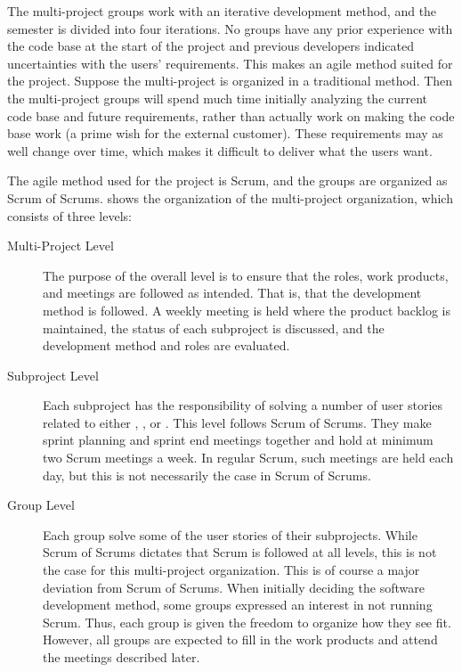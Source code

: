 The multi-project groups work with an iterative development method, and the semester is divided into four iterations. No groups have any prior experience with the code base at the start of the project and previous developers indicated uncertainties with the users' requirements. This makes an agile method suited for the project. Suppose the multi-project is organized in a traditional method. Then the multi-project groups will spend much time initially analyzing the current code base and future requirements, rather than actually work on making the code base work (a prime wish for the external customer). These requirements may as well change over time, which makes it difficult to deliver what the users want.

The agile method used for the project is Scrum, and the groups are organized as Scrum of Scrums.  shows the organization of the multi-project organization, which consists of three levels:

\begin{description}
  \item[Multi-Project Level] The purpose of the overall level is to ensure that the roles, work products, and meetings are followed as intended. That is, that the development method is followed. A weekly meeting is held where the product backlog is maintained, the status of each subproject is discussed, and the development method and roles are evaluated. 
  \item[Subproject Level] Each subproject has the responsibility of solving a number of user stories related to either \gui, \db, or \bd. This level follows Scrum of Scrums. They make sprint planning and sprint end meetings together and hold at minimum two Scrum meetings a week. In regular Scrum, such meetings are held each day, but this is not necessarily the case in Scrum of Scrums.
  \item[Group Level] Each group solve some of the user stories of their subprojects. While Scrum of Scrums dictates that Scrum is followed at all levels, this is not the case for this multi-project organization. This is of course a major deviation from Scrum of Scrums. When initially deciding the software development method, some groups expressed an interest in not running Scrum. Thus, each group is given the freedom to organize how they see fit. However, all groups are expected to fill in the work products and attend the meetings described later.
\end{description}

